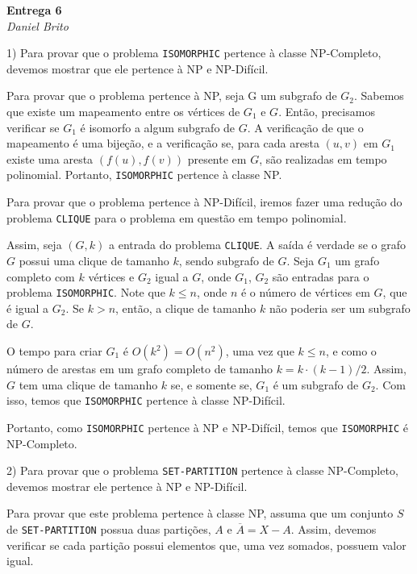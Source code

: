 \documentclass[]{article}
\begin{document}
\begin{center}
  \Large\textbf{Entrega 6}\\
  \large\textit{Daniel Brito}
\end{center}

1) Para provar que o problema \texttt{ISOMORPHIC} pertence à classe NP-Completo, devemos mostrar que ele pertence à NP e NP-Difícil.

Para provar que o problema pertence à NP, seja G um subgrafo de $G_2$. Sabemos que existe um mapeamento entre os vértices de $G_1$ e $G$. Então, precisamos verificar se $G_1$ é isomorfo a algum subgrafo de $G$. A verificação de que o mapeamento é uma bijeção, e a verificação se, para cada aresta $(u, v)$ em $G_1$ existe uma aresta $(f(u), f(v))$ presente em $G$, são realizadas em tempo polinomial. Portanto, \texttt{ISOMORPHIC} pertence à classe NP.

Para provar que o problema pertence à NP-Difícil, iremos fazer uma redução do problema \texttt{CLIQUE} para o problema em questão em tempo polinomial. 

Assim, seja $(G, k)$ a entrada do problema \texttt{CLIQUE}. A saída é verdade se o grafo $G$ possui uma clique de tamanho $k$, sendo subgrafo de $G$. Seja $G_1$ um grafo completo com $k$ vértices e $G_2$ igual a $G$, onde $G_1$, $G_2$ são entradas para o problema \texttt{ISOMORPHIC}. Note que $k \leq n$, onde $n$ é o número de vértices em $G$, que é igual a $G_2$. Se $k>n$, então, a clique de tamanho $k$ não poderia ser um subgrafo de $G$. 

O tempo para criar $G_1$ é $O(k^2)=O(n^2)$, uma vez que $k \leq n$, e como o número de arestas em um grafo completo de tamanho $k = k \cdot (k-1)/2$. Assim, $G$ tem uma clique de tamanho $k$ se, e somente se, $G_1$ é um subgrafo de $G_2$. Com isso, temos que \texttt{ISOMORPHIC} pertence à classe NP-Difícil.

Portanto, como \texttt{ISOMORPHIC} pertence à NP e NP-Difícil, temos que \texttt{ISOMORPHIC} é NP-Completo.

\newpage

2) Para provar que o problema \texttt{SET-PARTITION} pertence à classe NP-Completo, devemos mostrar ele pertence à NP e NP-Difícil.

Para provar que este problema pertence à classe NP, assuma que um conjunto $S$ de \texttt{SET-PARTITION} possua duas partições, $A$ e $\overline{A} = X - A$. Assim, devemos verificar se cada partição possui elementos que, uma vez somados, possuem valor igual. 
\end{document}
